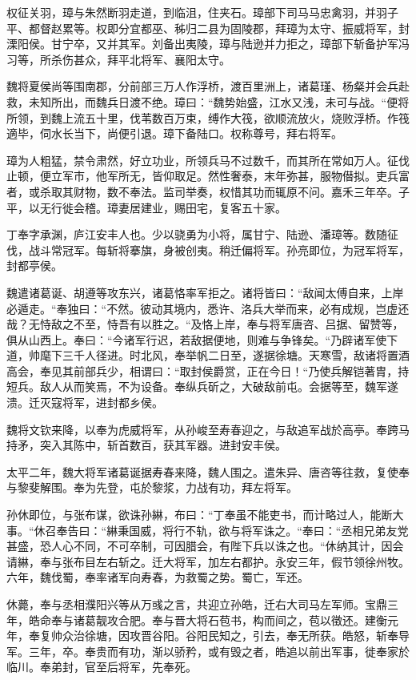 \documentclass[12pt,UTF8]{ctexbook}
\begin{document}
权征关羽，璋与朱然断羽走道，到临沮，住夹石。璋部下司马马忠禽羽，并羽子平、都督赵累等。权即分宜都巫、秭归二县为固陵郡，拜璋为太守、振威将军，封溧阳侯。甘宁卒，又并其军。刘备出夷陵，璋与陆逊并力拒之，璋部下斩备护军冯习等，所杀伤甚众，拜平北将军、襄阳太守。

魏将夏侯尚等围南郡，分前部三万人作浮桥，渡百里洲上，诸葛瑾、杨粲并会兵赴救，未知所出，而魏兵日渡不绝。璋曰：“魏势始盛，江水又浅，未可与战。“便将所领，到魏上流五十里，伐苇数百万束，缚作大筏，欲顺流放火，烧败浮桥。作筏適毕，伺水长当下，尚便引退。璋下备陆口。权称尊号，拜右将军。

璋为人粗猛，禁令肃然，好立功业，所领兵马不过数千，而其所在常如万人。征伐止顿，便立军巿，他军所无，皆仰取足。然性奢泰，末年弥甚，服物僣拟。吏兵富者，或杀取其财物，数不奉法。监司举奏，权惜其功而辄原不问。嘉禾三年卒。子平，以无行徙会稽。璋妻居建业，赐田宅，复客五十家。

丁奉字承渊，庐江安丰人也。少以骁勇为小将，属甘宁、陆逊、潘璋等。数随征伐，战斗常冠军。每斩将搴旗，身被创夷。稍迁偏将军。孙亮即位，为冠军将军，封都亭侯。

魏遣诸葛诞、胡遵等攻东兴，诸葛恪率军拒之。诸将皆曰：“敌闻太傅自来，上岸必遁走。“奉独曰：“不然。彼动其境内，悉许、洛兵大举而来，必有成规，岂虚还哉？无恃敌之不至，恃吾有以胜之。“及恪上岸，奉与将军唐咨、吕据、留赞等，俱从山西上。奉曰：“今诸军行迟，若敌据便地，则难与争锋矣。“乃辟诸军使下道，帅麾下三千人径进。时北风，奉举帆二日至，遂据徐塘。天寒雪，敌诸将置酒高会，奉见其前部兵少，相谓曰：“取封侯爵赏，正在今日！“乃使兵解铠著胄，持短兵。敌人从而笑焉，不为设备。奉纵兵斫之，大破敌前屯。会据等至，魏军遂溃。迁灭寇将军，进封都乡侯。

魏将文钦来降，以奉为虎威将军，从孙峻至寿春迎之，与敌追军战於高亭。奉跨马持矛，突入其陈中，斩首数百，获其军器。进封安丰侯。

太平二年，魏大将军诸葛诞据寿春来降，魏人围之。遣朱异、唐咨等往救，复使奉与黎斐解围。奉为先登，屯於黎浆，力战有功，拜左将军。

孙休即位，与张布谋，欲诛孙綝，布曰：“丁奉虽不能吏书，而计略过人，能断大事。“休召奉告曰：“綝秉国威，将行不轨，欲与将军诛之。“奉曰：“丞相兄弟友党甚盛，恐人心不同，不可卒制，可因腊会，有陛下兵以诛之也。“休纳其计，因会请綝，奉与张布目左右斩之。迁大将军，加左右都护。永安三年，假节领徐州牧。六年，魏伐蜀，奉率诸军向寿春，为救蜀之势。蜀亡，军还。

休薨，奉与丞相濮阳兴等从万彧之言，共迎立孙皓，迁右大司马左军师。宝鼎三年，皓命奉与诸葛靓攻合肥。奉与晋大将石苞书，构而间之，苞以徵还。建衡元年，奉复帅众治徐塘，因攻晋谷阳。谷阳民知之，引去，奉无所获。皓怒，斩奉导军。三年，卒。奉贵而有功，渐以骄矜，或有毁之者，皓追以前出军事，徙奉家於临川。奉弟封，官至后将军，先奉死。
\end{document}
